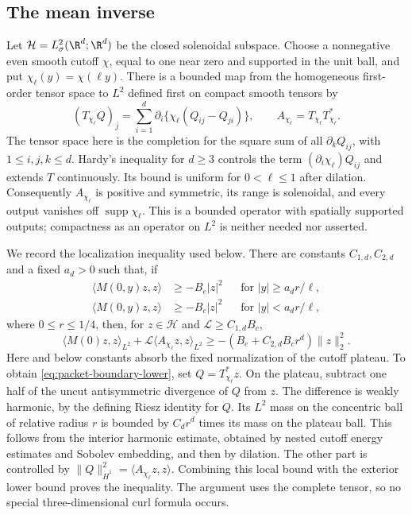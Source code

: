 \subsection{The mean inverse}
Let $\mathcal H=L^2_\sigma(\R^d;\R^d)$ be the closed solenoidal subspace.
Choose a nonnegative even smooth cutoff $\chi$, equal to one near zero and
supported in the unit ball, and put $\chi_\ell(y)=\chi(\ell y)$.
There is a bounded map from the homogeneous first-order tensor space to
$L^2$ defined first on compact smooth tensors by
\[
 (T_{\chi_\ell}Q)_j
   =\sum_{i=1}^d\partial_i\{\chi_\ell(Q_{ij}-Q_{ji})\},
 \qquad A_{\chi_\ell}=T_{\chi_\ell}T_{\chi_\ell}^{*}.
\]
The tensor space here is the completion for the square sum of all
$\partial_kQ_{ij}$, with $1\le i,j,k\le d$. Hardy's inequality for
$d\ge3$ controls the term $(\partial_i\chi_\ell)Q_{ij}$ and extends $T$
continuously. Its bound is uniform for $0<\ell\le1$ after dilation.
Consequently $A_{\chi_\ell}$ is positive and symmetric, its range is
solenoidal, and every output vanishes off $\operatorname{supp}\chi_\ell$.
This is a bounded operator with spatially supported outputs; compactness
as an operator on $L^2$ is neither needed nor asserted.

We record the localization inequality used below. There are constants
$C_{1,d},C_{2,d}$ and a fixed $a_d>0$ such that, if
\begin{align*}
 \langle M(0,y)z,z\rangle&\ge-B_e|z|^2
       &&\text{for }|y|\ge a_dr/\ell,\\
 \langle M(0,y)z,z\rangle&\ge-B_c|z|^2
       &&\text{for }|y|<a_dr/\ell,
\end{align*}
where $0\le r\le1/4$, then, for $z\in\mathcal H$ and
$\mathcal L\ge C_{1,d}B_c$,
\begin{equation}\label{eq:packet-boundary-lower}
 \langle M(0)z,z\rangle_{L^2}
 +\mathcal L\langle A_{\chi_\ell}z,z\rangle_{L^2}
 \ge-(B_e+C_{2,d}B_cr^d)\|z\|_2^2.
\end{equation}
Here and below constants absorb the fixed normalization of the
cutoff plateau. To obtain \eqref{eq:packet-boundary-lower}, set
$Q=T_{\chi_\ell}^{*}z$. On the plateau, subtract one half of the uncut
antisymmetric divergence of $Q$ from $z$. The difference is weakly
harmonic, by the defining Riesz identity for $Q$. Its $L^2$ mass on the
concentric ball of relative radius $r$ is bounded by $C_dr^d$ times its
mass on the plateau ball. This follows from the interior harmonic
estimate, obtained by nested cutoff energy estimates and Sobolev
embedding, and then by dilation. The other part is controlled by
$\|Q\|_{\dot H^1}^2=\langle A_{\chi_\ell}z,z\rangle$.
Combining this local bound with the exterior lower bound proves the
inequality. The argument uses the complete tensor, so no special
three-dimensional curl formula occurs.

